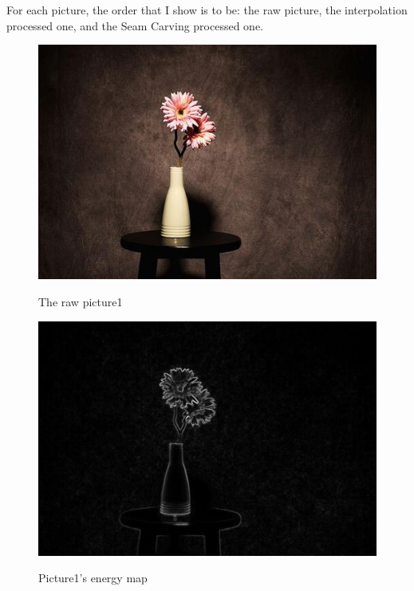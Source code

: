 \documentclass[final]{cvpr}
\begin{document}
For each picture, the order that I show is to be: the raw picture, the interpolation processed one, and the Seam Carving processed one.
\begin{figure}
\begin{center}
   \includegraphics[scale=0.3]{pics/2-1.jpg}
    \caption{The raw picture1}
    \label{pic2-1}
    \includegraphics[scale=0.15]{pics/0-2.png}
    \caption{Picture1's energy map}

\end{center}
\end{figure}
\end{document}
